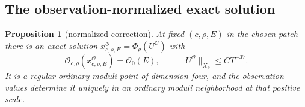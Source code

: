 \documentclass[11pt]{amsart}
\newtheorem{proposition}[theorem]{Proposition}
\theoremstyle{definition}
\theoremstyle{remark}
\theoremstyle{plain}
\begin{document}
\subsection{The observation-normalized exact solution}

\begin{proposition}[normalized correction]\label{prop:gluing-normalized-correction}
At fixed $(c,\rho,E)$ in the chosen patch there is an exact
solution $x^{\mathcal O}_{c,\rho,E}=\Phi_\rho(U^{\mathcal O})$
with
\begin{equation}\label{eq:gluing-normalized-correction}
 \mathcal O_{c,\rho}(x^{\mathcal O}_{c,\rho,E})=\mathcal O_0(E),
                           \qquad \|U^{\mathcal O}\|_{X_\rho}\leq CT^{-37}.
\end{equation}
It is a regular ordinary moduli point of dimension four, and the
observation values determine it uniquely in an ordinary moduli
neighborhood at that positive scale.
\end{proposition}
\end{document}
